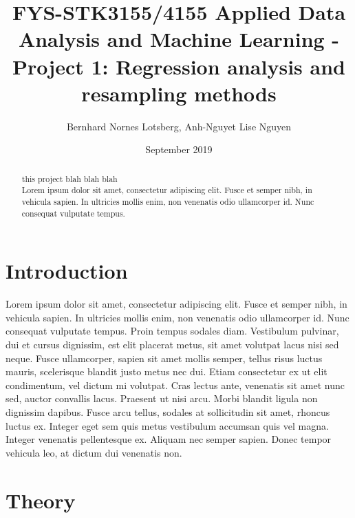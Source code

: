\documentclass[a4paper, 10pt]{article}
\title{FYS-STK3155/4155 Applied Data Analysis and Machine Learning - Project 1: Regression analysis and resampling methods }
\author{Bernhard Nornes Lotsberg, Anh-Nguyet Lise Nguyen}
\date{September 2019}
\begin{document}
\maketitle


\begin{abstract} \noindent
    this project blah blah blah\\
    Lorem ipsum dolor sit amet, consectetur adipiscing elit. Fusce et semper nibh, in vehicula sapien. In ultricies mollis enim, non venenatis odio ullamcorper id. Nunc consequat vulputate tempus.
\end{abstract}

\begin{multicols}{2}
\section{Introduction}



Lorem ipsum dolor sit amet, consectetur adipiscing elit. Fusce et semper nibh, in vehicula sapien. In ultricies mollis enim, non venenatis     odio ullamcorper id. Nunc consequat vulputate tempus. Proin tempus sodales diam. Vestibulum pulvinar, dui et cursus dignissim, est elit placerat metus, sit amet volutpat lacus nisi sed neque. Fusce ullamcorper, sapien sit amet mollis semper, tellus risus luctus mauris, scelerisque blandit justo metus nec dui. Etiam consectetur ex ut elit condimentum, vel dictum mi volutpat. Cras lectus ante, venenatis sit amet nunc sed, auctor convallis lacus. Praesent ut nisi arcu. Morbi blandit ligula non dignissim dapibus. Fusce arcu tellus, sodales at sollicitudin sit amet, rhoncus luctus ex. Integer eget sem quis metus vestibulum accumsan quis vel magna. Integer venenatis pellentesque ex. Aliquam nec semper sapien. Donec tempor vehicula leo, at dictum dui venenatis non.


\section{Theory}

\end{multicols}
\end{document}
